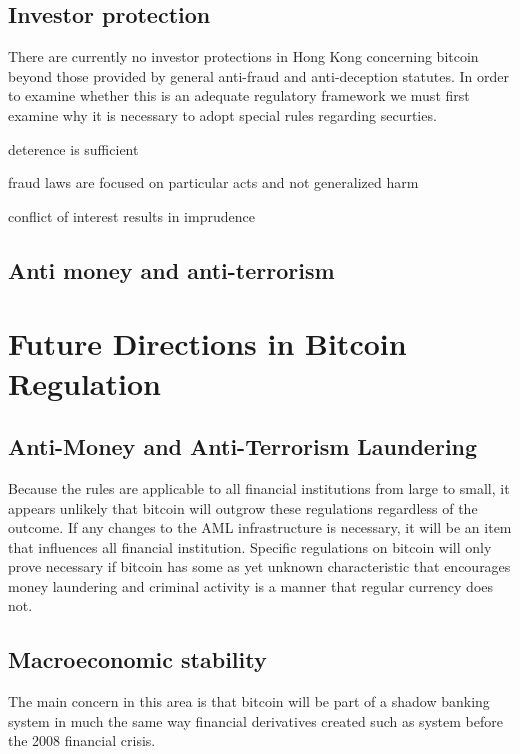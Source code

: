 \subsection{Investor protection}
There are currently no investor protections in Hong Kong concerning
bitcoin beyond those provided by general anti-fraud and anti-deception
statutes.  In order to examine whether this is an adequate regulatory
framework we must first examine why it is necessary to adopt special
rules regarding securties.

deterence is sufficient

fraud laws are focused on particular acts and not generalized harm

conflict of interest results in imprudence





\subsection{Anti money and anti-terrorism}

\section{Future Directions in Bitcoin Regulation}

\subsection{Anti-Money and Anti-Terrorism Laundering}

Because the rules are applicable to all financial institutions from
large to small, it appears unlikely that bitcoin will outgrow these
regulations regardless of the outcome.  If any changes to the AML
infrastructure is necessary, it will be an item that influences all
financial institution.  Specific regulations on bitcoin will only
prove necessary if bitcoin has some as yet unknown characteristic that
encourages money laundering and criminal activity is a manner that
regular currency does not.

\subsection{Macroeconomic stability}

The main concern in this area is that bitcoin will be part of a
shadow banking system in much the same way financial derivatives
created such as system before the 2008 financial crisis.


